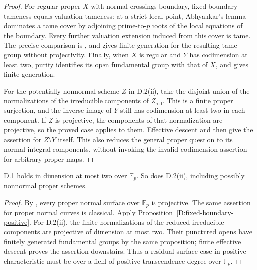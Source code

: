 \begin{proof}
For regular proper $X$ with normal-crossings boundary, fixed-boundary
tameness equals valuation tameness: at a strict local point,
Abhyankar's lemma dominates a tame cover by adjoining prime-to-$p$
roots of the local equations of the boundary. Every further valuation
extension induced from this cover is tame. The precise comparison is
\cite[Proposition 2.2.3]{AHLS2026}, and
\cite[Theorem 2.6.1]{AHLS2026} gives finite generation for the resulting
tame group without projectivity. Finally, when $X$ is regular and
$Y$ has codimension at least two, purity identifies its open
fundamental group with that of $X$, and
\cite[X, Theorem 2.9, pp. 273--274]{SGA1} gives finite generation.

For the potentially nonnormal scheme $Z$ in D.2(ii), take the disjoint
union of the normalizations of the irreducible components of
$Z_{\mathrm{red}}$. This is a finite proper surjection, and the
inverse image of $Y$ still has codimension at least two in each
component. If $Z$ is projective, the components of that normalization
are projective, so the proved case applies to them. Effective descent
and \cite[IX, Corollary 5.2, pp. 247--248]{SGA1} then give the
assertion for $Z\setminus Y$ itself. This also reduces the general
proper question to its normal integral components, without invoking
the invalid codimension assertion for arbitrary proper maps.
\end{proof}


\begin{corollary}
\label{D:finite-field-surfaces}
D.1 holds in dimension at most two over $\overline{\mathbb F}_p$.
So does D.2(ii), including possibly nonnormal proper schemes.
\end{corollary}
\begin{proof}
By \cite[Corollary 2.11; published Russian translation, p.~13]{Artin1962D},
every proper normal surface over $\overline{\mathbb F}_p$ is
projective. The same assertion for proper normal curves is classical.
Apply Proposition~\ref{D:fixed-boundary-positive}. For D.2(ii),
the finite normalizations of the reduced irreducible components
are projective of dimension at most two. Their punctured opens have
finitely generated fundamental groups by the same proposition;
finite effective descent proves the assertion downstairs. Thus a
residual surface case in positive characteristic must be over a
field of positive transcendence degree over $\mathbb F_p$.
\end{proof}

